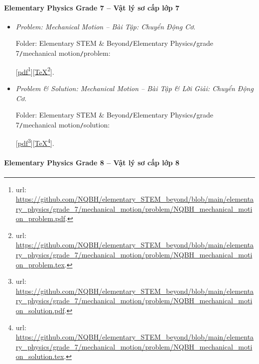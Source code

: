 \documentclass[12pt]{article}
\begin{document}
\paragraph{Elementary Physics Grade 7 -- Vật lý sơ cấp lớp 7}

\begin{itemize}
	\item {\it Problem: Mechanical Motion -- Bài Tập: Chuyển Động Cơ}.
	
	Folder: {\sf Elementary STEM \& Beyond{\tt/}Elementary Physics{\tt/}grade 7{\tt/}mechanical motion{\tt/}problem}:
	
	[\href{https://github.com/NQBH/elementary_STEM_beyond/blob/main/elementary_physics/grade_7/mechanical_motion/problem/NQBH_mechanical_motion_problem.pdf}{pdf}\footnote{{\sc url}: \url{https://github.com/NQBH/elementary_STEM_beyond/blob/main/elementary_physics/grade_7/mechanical_motion/problem/NQBH_mechanical_motion_problem.pdf}.}][\href{https://github.com/NQBH/elementary_STEM_beyond/blob/main/elementary_physics/grade_7/mechanical_motion/problem/NQBH_mechanical_motion_problem.tex}{\TeX}\footnote{{\sc url}: \url{https://github.com/NQBH/elementary_STEM_beyond/blob/main/elementary_physics/grade_7/mechanical_motion/problem/NQBH_mechanical_motion_problem.tex}.}].
	\item {\it Problem \& Solution: Mechanical Motion -- Bài Tập \& Lời Giải: Chuyển Động Cơ}.
	
	Folder: {\sf Elementary STEM \& Beyond{\tt/}Elementary Physics{\tt/}grade 7{\tt/}mechanical motion{\tt/}solution}:
	
	[\href{https://github.com/NQBH/elementary_STEM_beyond/blob/main/elementary_physics/grade_7/mechanical_motion/problem/NQBH_mechanical_motion_solution.pdf}{pdf}\footnote{{\sc url}: \url{https://github.com/NQBH/elementary_STEM_beyond/blob/main/elementary_physics/grade_7/mechanical_motion/problem/NQBH_mechanical_motion_solution.pdf}.}][\href{https://github.com/NQBH/elementary_STEM_beyond/blob/main/elementary_physics/grade_7/mechanical_motion/problem/NQBH_mechanical_motion_solution.tex}{\TeX}\footnote{{\sc url}: \url{https://github.com/NQBH/elementary_STEM_beyond/blob/main/elementary_physics/grade_7/mechanical_motion/problem/NQBH_mechanical_motion_solution.tex}.}].
\end{itemize}

\paragraph{Elementary Physics Grade 8 -- Vật lý sơ cấp lớp 8}
\end{document}

